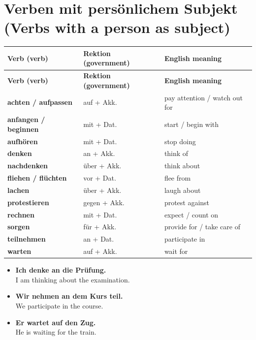 \documentclass[a4paper,11pt]{article}
\newcommand{\ExampleItem}[2]{\item \textbf{#1}\\{\small\color{SoftGray}#2}}
\begin{document}
\section{Verben mit persönlichem Subjekt (Verbs with a person as subject)}
\begin{longtable}{>{\raggedright\arraybackslash}p{} >{\raggedright\arraybackslash}p{} >{\raggedright\arraybackslash}p{}}
\rowcolor{HeaderBlueDark}
\color{white}\textbf{Verb (verb)} & \color{white}\textbf{Rektion (government)} & \color{white}\textbf{English meaning}\\
\endfirsthead
\rowcolor{HeaderBlueDark}
\color{white}\textbf{Verb (verb)} & \color{white}\textbf{Rektion (government)} & \color{white}\textbf{English meaning}\\
\endhead
\textbf{achten / aufpassen} & auf + Akk. & pay attention / watch out for\\
\textbf{anfangen / beginnen} & mit + Dat. & start / begin with\\
\textbf{aufhören} & mit + Dat. & stop doing\\
\textbf{denken} & an + Akk. & think of\\
\textbf{nachdenken} & über + Akk. & think about\\
\textbf{fliehen / flüchten} & vor + Dat. & flee from\\
\textbf{lachen} & über + Akk. & laugh about\\
\textbf{protestieren} & gegen + Akk. & protest against\\
\textbf{rechnen} & mit + Dat. & expect / count on\\
\textbf{sorgen} & für + Akk. & provide for / take care of\\
\textbf{teilnehmen} & an + Dat. & participate in\\
\textbf{warten} & auf + Akk. & wait for\\
\end{longtable}
\begin{exbox}
\begin{itemize}
\ExampleItem{Ich denke an die Prüfung.}{I am thinking about the examination.}
\ExampleItem{Wir nehmen an dem Kurs teil.}{We participate in the course.}
\ExampleItem{Er wartet auf den Zug.}{He is waiting for the train.}
\end{itemize}
\end{exbox}
\end{document}
